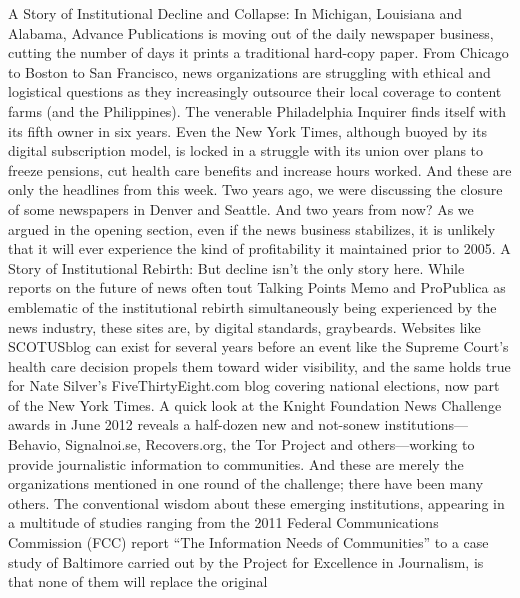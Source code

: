 A Story of Institutional Decline and Collapse: In Michigan, Louisiana and
Alabama, Advance Publications is moving out of the daily newspaper
business, cutting the number of days it prints a traditional hard-copy
paper. From Chicago to Boston to San Francisco, news organizations
are struggling with ethical and logistical questions as they increasingly
outsource their local coverage to content farms (and the Philippines).
The venerable Philadelphia Inquirer finds itself with its fifth owner
in six years. Even the New York Times, although buoyed by its digital
subscription model, is locked in a struggle with its union over plans to
freeze pensions, cut health care benefits and increase hours worked. And
these are only the headlines from this week. Two years ago, we were discussing
the closure of some newspapers in Denver and Seattle. And two
years from now? As we argued in the opening section, even if the news
business stabilizes, it is unlikely that it will ever experience the kind of
profitability it maintained prior to 2005.
A Story of Institutional Rebirth: But decline isn’t the only story here.
While reports on the future of news often tout Talking Points Memo
and ProPublica as emblematic of the institutional rebirth simultaneously
being experienced by the news industry, these sites are, by digital
standards, graybeards. Websites like SCOTUSblog can exist for several
years before an event like the Supreme Court’s health care decision
propels them toward wider visibility, and the same holds true for Nate
Silver’s FiveThirtyEight.com blog covering national elections, now part
of the New York Times. A quick look at the Knight Foundation News
Challenge awards in June 2012 reveals a half-dozen new and not-sonew
institutions—Behavio, Signalnoi.se, Recovers.org, the Tor Project
and others—working to provide journalistic information to communities.
And these are merely the organizations mentioned in one round of
the challenge; there have been many others.
The conventional wisdom about these emerging institutions, appearing
in a multitude of studies ranging from the 2011 Federal Communications
Commission (FCC) report ``The Information Needs of Communities''
to a case study of Baltimore carried out by the Project for
Excellence in Journalism, is that none of them will replace the original

